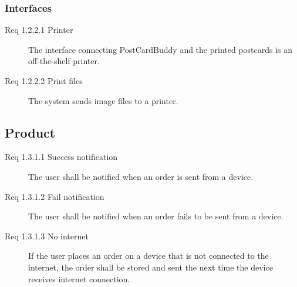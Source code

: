 \documentclass[10pt,a4paper]{article}
\begin{document}
\subsubsection{Interfaces}
\begin {description}
\item [Req 1.2.2.1 Printer] The interface connecting PostCardBuddy and the printed postcards is an off-the-shelf printer.
\item [Req 1.2.2.2 Print files] The system sends image files to a printer. 
\end{description}

\subsection{Product}
\begin{description}
\item [Req 1.3.1.1 Success notification] The user shall be notified when an order is sent from a device.
\item [Req 1.3.1.2 Fail notification] The user shall be notified when an order fails to be sent from a device.

\item [Req 1.3.1.3 No internet] If the user places an order on a device that is not connected to the internet, the order shall be stored and sent the next time the device receives internet connection. 

\end{description}
\end{document}
